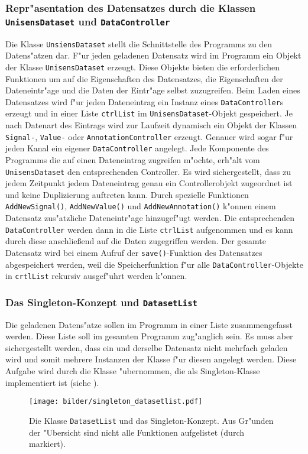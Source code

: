 \subsubsection{Repr"asentation des Datensatzes durch die Klassen \texttt{UnisensDataset} und \texttt{DataController}}
\label{sec:datensatz_repraesentation}

Die Klasse \verb|UnsiensDataset| stellt die Schnittstelle des Programms zu den Datens"atzen dar.
F"ur jeden geladenen Datensatz wird im Programm ein Objekt der Klasse \verb|UnisensDataset| erzeugt.
Diese Objekte bieten die erforderlichen Funktionen um auf die Eigenschaften des Datensatzes, die Eigenschaften der Dateneintr"age und die Daten der Eintr"age selbst zuzugreifen.
Beim Laden eines Datensatzes wird f"ur jeden Dateneintrag ein Instanz eines \verb|DataController|s erzeugt und in einer Liste \verb|ctrlList| im \verb|UnisensDataset|-Objekt gespeichert.
Je nach Datenart des Eintrags wird zur Laufzeit dynamisch ein Objekt der Klassen \verb|Signal-|, \verb|Value-| oder \verb|AnnotationController| erzeugt.
Genauer wird sogar f"ur jeden Kanal ein eigener \verb|DataController| angelegt.
Jede Komponente des Programms die auf einen Dateneintrag zugreifen m"ochte, erh"alt vom \verb|UnisensDataset| den entsprechenden Controller.
Es wird sichergestellt, dass zu jedem Zeitpunkt jedem Dateneintrag genau ein Controllerobjekt zugeordnet ist und keine Duplizierung auftreten kann.
Durch spezielle Funktionen \verb|AddNewSignal()|, \verb|AddNewValue()| und \verb|AddNewAnnotation()| k"onnen einem Datensatz zus"atzliche Dateneintr"age hinzugef"ugt werden.
Die entsprechenden \verb|DataController| werden dann in die Liste \verb|ctrlList| aufgenommen und es kann durch diese anschlie\ss end auf die Daten zugegriffen werden.
Der gesamte Datensatz wird bei einem Aufruf der \verb|save()|-Funktion des Datensatzes abgespeichert werden, weil die Speicherfunktion f"ur alle \verb|DataController|-Objekte in \verb|crtlList| rekursiv ausgef"uhrt werden k"onnen.

\subsubsection{Das Singleton-Konzept und \texttt{DatasetList}}
\label{sec:singleton}
\label{sec:datasetlist}

Die geladenen Datens"atze sollen im Programm in einer Liste zusammengefasst werden.
Diese Liste soll im gesamten Programm zug"anglich sein.
Es muss aber sichergestellt werden, dass ein und derselbe Datensatz nicht mehrfach geladen wird und somit mehrere Instanzen der Klasse  f"ur diesen angelegt werden.
Diese Aufgabe wird durch die Klasse  "ubernommen, die als Singleton-Klasse implementiert ist (siehe ).
\begin{figure}[htb]
\centering
\texttt{[image: bilder/singleton\_datasetlist.pdf]}
\caption[Klasse \texttt{DatasetList} und das Singleton-Konzept]{Die Klasse \texttt{DatasetList} und das Singleton-Konzept. Aus Gr"unden der "Ubersicht sind nicht alle Funktionen aufgelistet (durch  markiert).}
\label{pic:datasetlist}
\end{figure}

